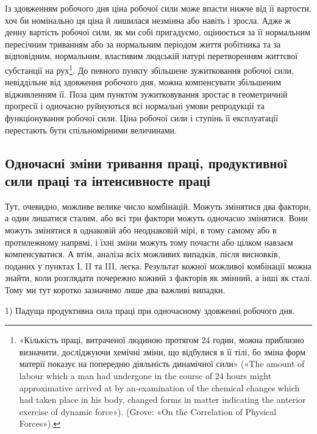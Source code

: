 Із здовженням робочого дня ціна робочої сили може впасти
нижче від її вартости, хоч би номінально ця ціна й лишилася
незмінна або навіть і зросла. Адже ж денну вартість робочої сили,
як ми собі пригадуємо, оцінюється за її нормальним пересічним
триванням або за нормальним періодом життя робітника та за
відповідним, нормальним, властивим людській натурі перетворенням
життєвої субстанції на рух\footnote{
«Кількість праці, витраченої людиною протягом 24 годин, можна
приблизно визначити, досліджуючи хемічні зміни, що відбулися в її
тілі, бо зміна форм матерії показує на попередню діяльність динамічної
сили» («The amount of labour which a man had undergone in the course
of 24 hours might approximative arrived at by an-examination of the
chemical changes which had taken place in his body, changed forms in
matter indicating the anterior exercise of dynamic force»). (Grove: «On
the Correlation of Physical Forces»).
}. До певного пункту збільшене
зужитковання робочої сили, невіддільне від здовження
робочого дня, можна компенсувати збільшеним відживленням її.
Поза цим пунктом зужитковування зростає в геометричній проґресії
і одночасно руйнуються всі нормальні умови репродукції
та функціонування робочої сили. Ціна робочої сили і ступінь
її експлуатації перестають бути спільномірними величинами.

\subsection{Одночасні зміни тривання праці, продуктивної сили праці
та інтенсивносте праці}

Тут, очевидно, можливе велике число комбінацій. Можуть
змінятися два фактори, а один лишатися сталим, або всі три фактори
можуть одночасно змінятися. Вони можуть змінятися в
однаковій або неоднаковій мірі, в тому самому або в протилежному
напрямі, і їхні зміни можуть тому почасти або цілком
навзаєм компенсуватися. А втім, аналіза всіх можливих випадків,
після висновків, поданих у пунктах І, II та III, легка. Результат
кожної можливої комбінації можна знайти, коли розглядати
почережно кожний з факторів як змінний, а інші як сталі.
Тому ми тут коротко зазначимо лише два важливі випадки.

1) Падуща продуктивна сила праці при одночасному здовженні
робочого дня.

